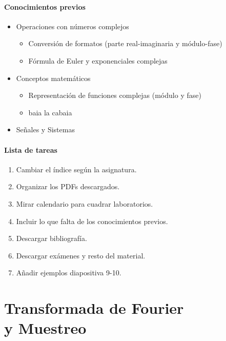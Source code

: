\documentclass[a4paper]{book}
\begin{document}
\subsubsection{Conocimientos previos} \vspace{\parskip}
\begin{itemize}
	\item Operaciones con números complejos
	      \begin{itemize}
		      \item Conversión de formatos (parte real-imaginaria y módulo-fase)
		      \item Fórmula de Euler y exponenciales complejas
	      \end{itemize}
	\item Conceptos matemáticos
	      \begin{itemize}
		      \item Representación de funciones complejas (módulo y fase)
		      \item baia la cabaia
	      \end{itemize}
	\item Señales y Sistemas
\end{itemize}

\subsubsection{Lista de tareas} \vspace{\parskip}
\begin{enumerate}
	\item Cambiar el índice según la asignatura.
	\item Organizar los PDFs descargados.
	\item Mirar calendario para cuadrar laboratorios.
	\item Incluir lo que falta de los conocimientos previos.
	\item Descargar bibliografía.
	\item Descargar exámenes y resto del material.
	\item Añadir ejemplos diapositiva 9-10.
\end{enumerate}
\newpage

\setlength{\parskip}{0em}
\tableofcontents
\setlength{\parskip}{0.5em}


\chapter*{Transformada de Fourier\\ y Muestreo}
\end{document}
